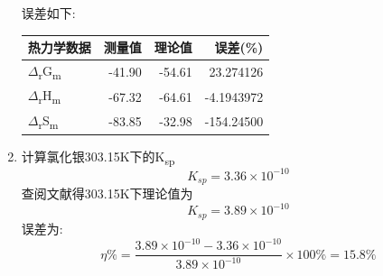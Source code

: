 \documentclass[11pt]{report}
\begin{document}
\begin{enumerate}
\[     \]
误差如下:
\begin{center}
\begin{tabular}{lrrr}
热力学数据 & 测量值 & 理论值 & 误差(\%)\\
\hline
\(\Delta\)\textsubscript{r}G\textsubscript{m} & -41.90 & -54.61 & 23.274126\\
\(\Delta\)\textsubscript{r}H\textsubscript{m} & -67.32 & -64.61 & -4.1943972\\
\(\Delta\)\textsubscript{r}S\textsubscript{m} & -83.85 & -32.98 & -154.24500\\
\end{tabular}
\end{center}
\item 计算氯化银303.15K下的K\textsubscript{sp}
\label{sec:orgc68f1ca}
\[
     K_{sp}=3.36\times 10^{-10}
     \]
查阅文献得303.15K下理论值为
\[
     K_{sp}=3.89\times 10^{-10}
     \]
误差为:
\[
     \eta\% = \frac{3.89\times 10^{-10}-3.36\times 10^{-10}}{3.89\times 10^{-10}}\times 100\%= 15.8\%
     \]
\end{enumerate}
\end{document}
